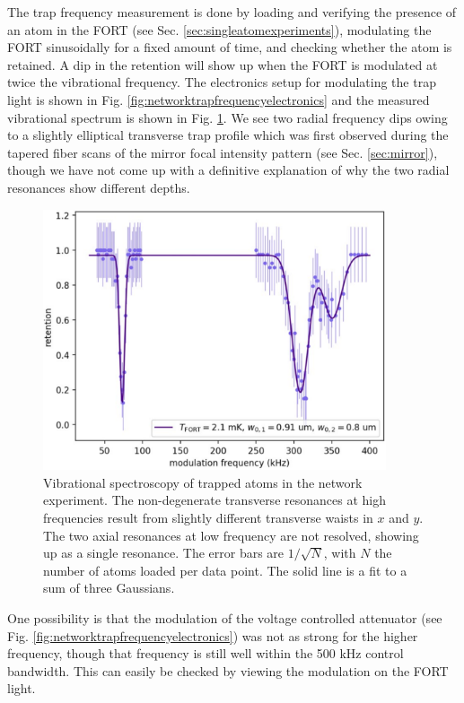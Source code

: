 The trap frequency measurement is done by loading and verifying the presence of an atom in the FORT (see Sec. \ref{sec:singleatomexperiments}), modulating the FORT sinusoidally for a fixed amount of time, and checking whether the atom is retained. A dip in the retention will show up when the FORT is modulated at twice the vibrational frequency. The electronics setup for modulating the trap light is shown in Fig. \ref{fig:networktrapfrequencyelectronics} and the measured vibrational spectrum is shown in Fig. \ref{fig:networktrapfrequencies}. We see two radial frequency dips owing to a slightly elliptical transverse trap profile which was first observed during the tapered fiber scans of the mirror focal intensity pattern (see Sec. \ref{sec:mirror}), though we have not come up with a definitive explanation of why the two radial resonances show different depths. 
\begin{figure}[!ht]
    \centering
    \includegraphics[width=0.9\textwidth]{Images/network_trap_frequencies_20240627.pdf}
    \caption{Vibrational spectroscopy of trapped atoms in the network experiment. The non-degenerate transverse resonances at high frequencies result from slightly different transverse waists in $x$ and $y$. The two axial resonances at low frequency are not resolved, showing up as a single resonance. The error bars are $1/\sqrt{N}$, with $N$ the number of atoms loaded per data point. The solid line is a fit to a sum of three Gaussians.}
    \label{fig:networktrapfrequencies}
\end{figure}
One possibility is that the modulation of the voltage controlled attenuator (see Fig. \ref{fig:networktrapfrequencyelectronics}) was not as strong for the higher frequency, though that frequency is still well within the 500 kHz control bandwidth. This can easily be checked by viewing the modulation on the FORT light.
    
